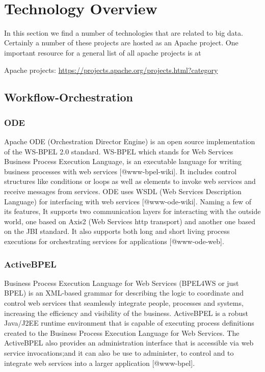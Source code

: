 \FILENAME\

\chapter{Technology Overview}


In this section we find a number of technologies that are related to
big data. Certainly a number of these projects are hosted as an Apache
project. One important resource for a general list of all apache
projects is at


Apache projects: \url{https://projects.apache.org/projects.html?category}


\section{Workflow-Orchestration}

\subsection{ODE}

Apache ODE (Orchestration Director Engine) is an open source
implementation of the WS-BPEL 2.0 standard. WS-BPEL which stands for
Web Services Business Process Execution Language, is an executable
language for writing business processes with web
services [@www-bpel-wiki].  It includes control structures like
conditions or loops as well as elements to invoke web services and
receive messages from services.  ODE uses WSDL (Web Services
Description Language) for interfacing with web
services [@www-ode-wiki]. Naming a few of its features, It
supports two communication layers for interacting with the outside
world, one based on Axis2 (Web Services http transport) and another
one based on the JBI standard. It also supports both long and short
living process executions for orchestrating services for
applications [@www-ode-web].

\subsection{ActiveBPEL}

Business Process Execution Language for Web Services (BPEL4WS or just
BPEL) is an XML-based grammar for describing the logic to coordinate
and control web services that seamlessly integrate people, processes
and systems, increasing the efficiency and visibility of the
business. ActiveBPEL is a robust Java/J2EE runtime environment that is
capable of executing process definitions created to the Business
Process Execution Language for Web Services. The ActiveBPEL also
provides an administration interface that is accessible via web
service invocations;and it can also be use to administer, to control
and to integrate web services into a larger
application [@www-bpel].


